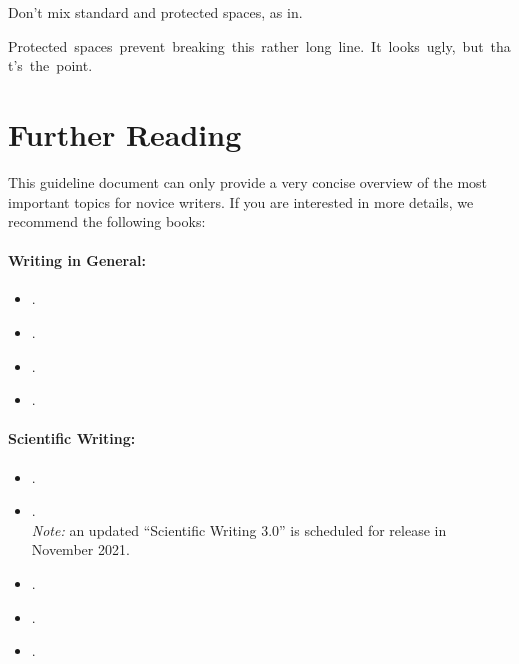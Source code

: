 \documentclass[11pt,a4paper]{article}
\begin{document}
\begin{itemize}
 
 
 \begin{goodexample}
   \begin{NoHyper}
     
   
    \end{NoHyper}
 \end{goodexample}
 \begin{badexample}
   \begin{NoHyper}
%    
    Don't mix standard and protected spaces, as in\badstyle{\textvisiblespace\textvisiblespace}\cite{smith14}.

    {Protected~spaces~prevent~breaking~this~rather~long~line.~It~looks~ugly,~but~that's~the~point.}
   
   \end{NoHyper}
 \end{badexample}

\end{itemize}



\newpage
\vspace{1cm}
\section{Further Reading}
\label{sec-further-reading}
This guideline document can only provide a very concise overview of the most important topics for novice writers.
If you are interested in more details, we recommend the following books:
% 
\paragraph*{Writing in General:}
\begin{itemize}
  \item {}.
  \item {}.
  \item {}.
  \item {}.
\end{itemize}
% 
\paragraph*{Scientific Writing:}
\begin{itemize}
  \item {}.
  \item {}.\\\emph{Note:} an updated ``Scientific Writing 3.0'' is scheduled for release in November 2021.
  \item {}.
  \item {}.
  \item {}.
\end{itemize}
\end{document}
